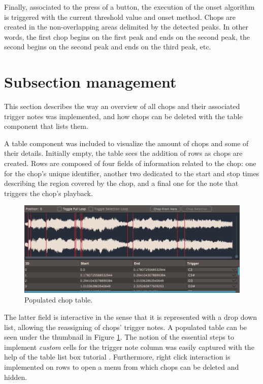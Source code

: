 \documentclass[12pt, a4paper, hidelinks]{report}
\begin{document}
	Finally, associated to the press of a button, the execution of the onset algorithm is triggered with the current threshold value and onset method. Chops are created in the non-overlapping areas delimited by the detected peaks. In other words, the first chop begins on the first peak and ends on the second peak, the second begins on the second peak and ends on the third peak, etc.
	
	
	\section{Subsection management}
	This section describes the way an overview of all chops and their associated trigger notes was implemented, and how chops can be deleted with the table component that lists them. \par
	A table component was included to visualize the amount of chops and some of their details. Initially empty, the table sees the addition of rows as chops are created. Rows are composed of four fields of information related to the chop: one for the chop's unique identifier, another two dedicated to the start and stop times describing the region covered by the chop, and a final one for the note that triggers the chop's playback.
	\begin{figure}[h!]
		\centering
		\includegraphics[width=\textwidth]{u/choptable.png}
		\caption{Populated chop table.}
		\label{fig:table}
	\end{figure}
	The latter field is interactive in the sense that it is represented with a drop down list, allowing the reassigning of chops' trigger notes. A populated table can be seen under the thumbnail in Figure \ref{fig:table}. The notion of the essential steps to implement \textit{custom} cells for the trigger note column was easily captured with the help of the table list box tutorial \cite{tablelistbox}. Furthermore, right click interaction is implemented on rows to open a menu from which chops can be deleted and hidden.\par 
\end{document}
